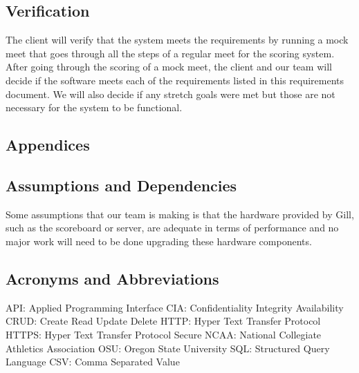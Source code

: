 \documentclass[letterpaper,10pt,draftclsnofoot,onecolumn,]{article}
\begin{document}
\begin{center}
\section{Verification}
\end{center}
The client will verify that the system meets the requirements by running a mock meet that goes through all the steps of a regular meet for the scoring system. After going through the scoring of a mock meet, the client and our team will decide if the software meets each of the requirements listed in this requirements document. We will also decide if any stretch goals were met but those are not necessary for the system to be functional. \\

\begin{center}
\section{Appendices}
\end{center}

\subsection{Assumptions and Dependencies}
Some assumptions that our team is making is that the hardware provided by Gill, such as the scoreboard or server, are adequate in terms of performance and no major work will need to be done upgrading these hardware components.

\subsection{Acronyms and Abbreviations}
API: Applied Programming Interface\newline
CIA: Confidentiality Integrity Availability\newline
CRUD: Create Read Update Delete\newline
HTTP: Hyper Text Transfer Protocol\newline
HTTPS: Hyper Text Transfer Protocol Secure\newline
NCAA: National Collegiate Athletics Association\newline
OSU: Oregon State University\newline
SQL: Structured Query Language\newline
CSV: Comma Separated Value\newline
\end{document}
